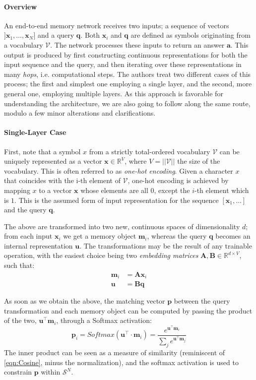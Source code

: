 \documentclass[]{article}
\begin{document}
\paragraph{Overview}
An end-to-end memory network receives two inputs; a sequence of vectors $]\pmb{x}_1,\dots,\pmb{x}_N]$ and a query $\pmb{q}$. Both $\pmb{x}_i$ and $\pmb{q}$ are defined as symbols originating from a vocabulary $\mathcal{V}$. The network processes these inputs to return an answer $\pmb{a}$. This output is produced by first constructing continuous representations for both the input sequence and the query, and then iterating over these representations in many \textit{hops}, i.e. computational steps. The authors treat two different cases of this process; the first and simplest one employing a single layer, and the second, more general one, employing multiple layers. As this approach is favorable for understanding the architecture, we are also going to follow along the same route, modulo a few minor alterations and clarifications.

\paragraph{Single-Layer Case} First, note that a symbol $x$ from a strictly total-ordered vocabulary $\mathcal{V}$ can be uniquely represented as a vector $\pmb{x} \in \mathbb{R}^{V}$, where $V = ||\mathcal{V}||$ the size of the vocabulary. This is often referred to as \textit{one-hot encoding}. Given a character $x$ that coincides with the i-th element of $\mathcal{V}$, one-hot encoding is achieved by mapping $x$ to a vector $\pmb{x}$ whose elements are all $0$, except the $i$-th element which is $1$. This is the assumed form of input representation for the sequence $[\pmb{x}_1,\dots]$ and the query $\pmb{q}$. 

The above are transformed into two new, continuous spaces of dimensionality $d$; from each input $\pmb{x}_i$ we get a memory object $\pmb{m}_i$, whereas the query $\pmb{q}$ becomes an internal representation $\pmb{u}$. The transformations may be the result of any trainable operation, with the easiest choice being two \textit{embedding matrices} $\pmb{A}, \pmb{B} \in \mathbb{R}^{d\times V}$, such that:
\begin{align}
\pmb{m}_i &= \pmb{A}\pmb{x}_i \tag{Memory Transformation} \\
\pmb{u} &= \pmb{B}\pmb{q} \tag{Query Transformation}
\end{align}

As soon as we obtain the above, the matching vector $\pmb{p}$ between the query transformation and each memory object can be computed by passing the product of the two, $\pmb{u}^\top \pmb{m}_i$, through a Softmax activation:
\[
\tag{Memory Matching}
\pmb{p}_i = Softmax(\pmb{u}^\top \cdot \pmb{m}_i) = \frac{e^{\pmb{u}^\top\pmb{m}_i}}{\sum_j{e^{\pmb{u}^\top\pmb{m}_j}}}
\]
The inner product can be seen as a measure of similarity (reminiscent of \ref{eqn:Cosine}, minus the normalization), and the softmax activation is used to constrain $\pmb{p}$ within $\mathcal{S}^N$. 
\end{document}
